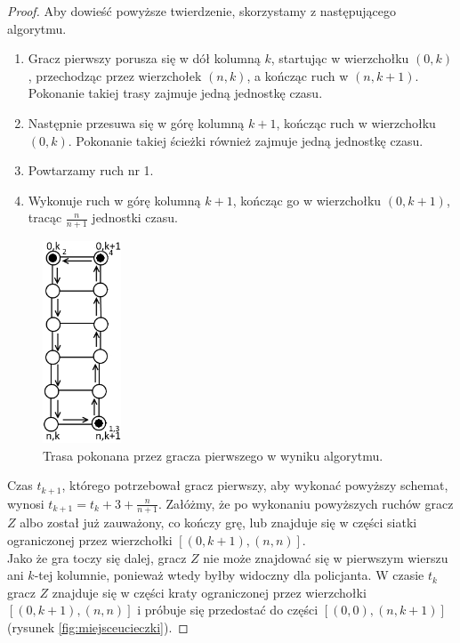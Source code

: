 \documentclass{xmgr}
\theoremstyle{definition}
\begin{document}
\begin{proof}
	Aby dowieść powyższe twierdzenie, skorzystamy z następującego algorytmu.
	\begin{enumerate}
		\item Gracz pierwszy porusza się w dół kolumną $k$, startując w wierzchołku $(0,k)$, przechodząc przez wierzchołek $(n, k)$, a kończąc ruch w $(n, k + 1)$. Pokonanie takiej trasy zajmuje jedną jednostkę czasu.
		\item Następnie przesuwa się w górę kolumną $k + 1$, kończąc ruch w wierzchołku $(0,k)$. Pokonanie takiej ścieżki również zajmuje jedną jednostkę czasu.
		\item Powtarzamy ruch nr 1.
		\item Wykonuje ruch w górę kolumną $k + 1$, kończąc go w wierzchołku $(0,k + 1)$, tracąc $\frac{n}{n+1}$ jednostki czasu.
	\end{enumerate}
	\begin{figure}[ht!]
	  \centering
	  \includegraphics[height=6cm]{rysunki/schemat_ruchu.png}
	  \caption{Trasa pokonana przez gracza pierwszego w wyniku algorytmu.}
	\end{figure} 

	Czas $t_{k+1}$, którego potrzebował gracz pierwszy, aby wykonać powyższy schemat, wynosi $t_{k+1} = t_k + 3 + \frac{n}{n+1}$.
	Załóżmy, że po wykonaniu powyższych ruchów gracz $Z$ albo został już zauważony, co kończy grę, lub znajduje się w części siatki ograniczonej przez wierzchołki $[(0,k + 1), (n, n)]$.
	\\\indent Jako że gra toczy się dalej, gracz $Z$ nie może znajdować się w pierwszym wierszu ani $k$-tej kolumnie, ponieważ wtedy byłby widoczny dla policjanta. W czasie $t_k$ gracz $Z$ znajduje się w części kraty ograniczonej przez wierzchołki $[(0,k + 1), (n, n)]$ i próbuje się przedostać do części $[(0,0), (n, k + 1)]$ (rysunek \ref{fig:miejsceucieczki}).


\end{proof}
\end{document}
